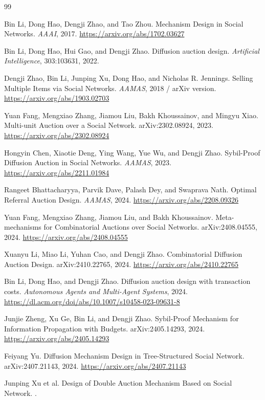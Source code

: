 \documentclass[11pt]{article}
\begin{document}
\newpage
\begin{thebibliography}{99}

Bin Li, Dong Hao, Dengji Zhao, and Tao Zhou.
\newblock Mechanism Design in Social Networks.
\newblock \emph{AAAI}, 2017. \url{https://arxiv.org/abs/1702.03627}

Bin Li, Dong Hao, Hui Gao, and Dengji Zhao.
\newblock Diffusion auction design.
\newblock \emph{Artificial Intelligence}, 303:103631, 2022.

Dengji Zhao, Bin Li, Junping Xu, Dong Hao, and Nicholas R. Jennings.
\newblock Selling Multiple Items via Social Networks.
\newblock \emph{AAMAS}, 2018 / arXiv version. \url{https://arxiv.org/abs/1903.02703}

Yuan Fang, Mengxiao Zhang, Jiamou Liu, Bakh Khoussainov, and Mingyu Xiao.
\newblock Multi-unit Auction over a Social Network.
\newblock arXiv:2302.08924, 2023. \url{https://arxiv.org/abs/2302.08924}

Hongyin Chen, Xiaotie Deng, Ying Wang, Yue Wu, and Dengji Zhao.
\newblock Sybil-Proof Diffusion Auction in Social Networks.
\newblock \emph{AAMAS}, 2023. \url{https://arxiv.org/abs/2211.01984}

Rangeet Bhattacharyya, Parvik Dave, Palash Dey, and Swaprava Nath.
\newblock Optimal Referral Auction Design.
\newblock \emph{AAMAS}, 2024. \url{https://arxiv.org/abs/2208.09326}

Yuan Fang, Mengxiao Zhang, Jiamou Liu, and Bakh Khoussainov.
\newblock Meta-mechanisms for Combinatorial Auctions over Social Networks.
\newblock arXiv:2408.04555, 2024. \url{https://arxiv.org/abs/2408.04555}

Xuanyu Li, Miao Li, Yuhan Cao, and Dengji Zhao.
\newblock Combinatorial Diffusion Auction Design.
\newblock arXiv:2410.22765, 2024. \url{https://arxiv.org/abs/2410.22765}

Bin Li, Dong Hao, and Dengji Zhao.
\newblock Diffusion auction design with transaction costs.
\newblock \emph{Autonomous Agents and Multi-Agent Systems}, 2024. \url{https://dl.acm.org/doi/abs/10.1007/s10458-023-09631-8}

Junjie Zheng, Xu Ge, Bin Li, and Dengji Zhao.
\newblock Sybil-Proof Mechanism for Information Propagation with Budgets.
\newblock arXiv:2405.14293, 2024. \url{https://arxiv.org/abs/2405.14293}

Feiyang Yu.
\newblock Diffusion Mechanism Design in Tree-Structured Social Network.
\newblock arXiv:2407.21143, 2024. \url{https://arxiv.org/abs/2407.21143}

Junping Xu et al.
\newblock Design of Double Auction Mechanism Based on Social Network.
.

\end{thebibliography}
\end{document}
